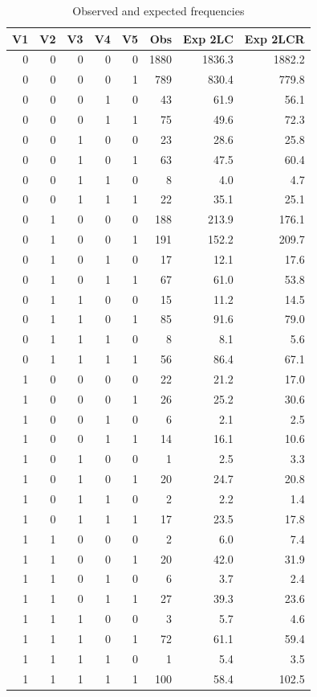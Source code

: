 \begin{table}[ht]
\centering
\begin{tabular}{rrrrrrrr}
  \hline
V1 & V2 & V3 & V4 & V5 & Obs & Exp 2LC & Exp 2LCR \\ 
  \hline
0 & 0 & 0 & 0 & 0 & 1880 & 1836.3 & 1882.2 \\ 
  0 & 0 & 0 & 0 & 1 & 789 & 830.4 & 779.8 \\ 
  0 & 0 & 0 & 1 & 0 & 43 & 61.9 & 56.1 \\ 
  0 & 0 & 0 & 1 & 1 & 75 & 49.6 & 72.3 \\ 
  0 & 0 & 1 & 0 & 0 & 23 & 28.6 & 25.8 \\ 
  0 & 0 & 1 & 0 & 1 & 63 & 47.5 & 60.4 \\ 
  0 & 0 & 1 & 1 & 0 & 8 & 4.0 & 4.7 \\ 
  0 & 0 & 1 & 1 & 1 & 22 & 35.1 & 25.1 \\ 
  0 & 1 & 0 & 0 & 0 & 188 & 213.9 & 176.1 \\ 
  0 & 1 & 0 & 0 & 1 & 191 & 152.2 & 209.7 \\ 
  0 & 1 & 0 & 1 & 0 & 17 & 12.1 & 17.6 \\ 
  0 & 1 & 0 & 1 & 1 & 67 & 61.0 & 53.8 \\ 
  0 & 1 & 1 & 0 & 0 & 15 & 11.2 & 14.5 \\ 
  0 & 1 & 1 & 0 & 1 & 85 & 91.6 & 79.0 \\ 
  0 & 1 & 1 & 1 & 0 & 8 & 8.1 & 5.6 \\ 
  0 & 1 & 1 & 1 & 1 & 56 & 86.4 & 67.1 \\ 
  1 & 0 & 0 & 0 & 0 & 22 & 21.2 & 17.0 \\ 
  1 & 0 & 0 & 0 & 1 & 26 & 25.2 & 30.6 \\ 
  1 & 0 & 0 & 1 & 0 & 6 & 2.1 & 2.5 \\ 
  1 & 0 & 0 & 1 & 1 & 14 & 16.1 & 10.6 \\ 
  1 & 0 & 1 & 0 & 0 & 1 & 2.5 & 3.3 \\ 
  1 & 0 & 1 & 0 & 1 & 20 & 24.7 & 20.8 \\ 
  1 & 0 & 1 & 1 & 0 & 2 & 2.2 & 1.4 \\ 
  1 & 0 & 1 & 1 & 1 & 17 & 23.5 & 17.8 \\ 
  1 & 1 & 0 & 0 & 0 & 2 & 6.0 & 7.4 \\ 
  1 & 1 & 0 & 0 & 1 & 20 & 42.0 & 31.9 \\ 
  1 & 1 & 0 & 1 & 0 & 6 & 3.7 & 2.4 \\ 
  1 & 1 & 0 & 1 & 1 & 27 & 39.3 & 23.6 \\ 
  1 & 1 & 1 & 0 & 0 & 3 & 5.7 & 4.6 \\ 
  1 & 1 & 1 & 0 & 1 & 72 & 61.1 & 59.4 \\ 
  1 & 1 & 1 & 1 & 0 & 1 & 5.4 & 3.5 \\ 
  1 & 1 & 1 & 1 & 1 & 100 & 58.4 & 102.5 \\ 
   \hline
\end{tabular}
\caption{Observed and expected frequencies} 
\label{tab:obs}
\end{table}
